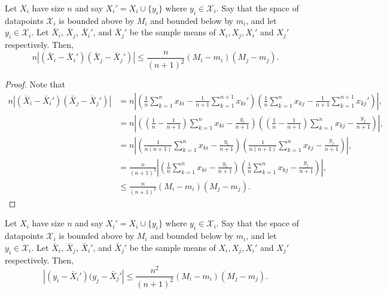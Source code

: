 \documentclass[11pt]{scrartcl} %
\begin{document}
\begin{lemma}
Let  $X_i$ have size $n$ and say $X_i' = X_i \cup \{y_i\}$ where $y_i \in \mathcal{X}_i.$ Say that the space of datapoints $\mathcal{X}_i$ is bounded above by $M_i$ and bounded below by $m_i$, and let $y_i \in \mathcal{X}_i.$ Let  $\bar{X}_i$, $\bar{X}_j$, $\bar{X}_i'$, and $\bar{X}_j'$ be the sample means of $X_i, X_j, X_i'$ and $X_j'$ respectively. Then,
$$ n \left\vert (\bar{X}_i - \bar{X}_i')(\bar{X}_j - \bar{X}_j') \right\vert \le \frac{n}{(n+1)^2}(M_i - m_i)(M_j - m_j).$$
\end{lemma}

\begin{proof}
Note that
\begin{align*}
 n \left\vert (\bar{X}_i - \bar{X}_i')(\bar{X}_j - \bar{X}_j') \right\vert &= n\left\vert \left( \frac{1}{n} \sum_{k=1}^n x_{ki} - \frac{1}{n+1} \sum_{k=1}^{n+1} x_{ki}' \right) \left( \frac{1}{n} \sum_{k=1}^n x_{kj} - \frac{1}{n+1} \sum_{k=1}^{n+1} x_{kj}' \right)\right\vert, \\
 	&= n \left\vert \left( \left(\frac{1}{n} - \frac{1}{n+1}\right) \sum_{k=1}^n x_{ki} - \frac{y_i}{n+1} \right)\left( \left(\frac{1}{n} - \frac{1}{n+1}\right) \sum_{k=1}^n x_{kj} - \frac{y_j}{n+1} \right) \right\vert, \\
	&= n  \left\vert \left(\frac{1}{n(n+1)} \sum_{k=1}^n x_{ki} - \frac{y_i}{n+1} \right)\left( \frac{1}{n(n+1)} \sum_{k=1}^n x_{kj} - \frac{y_j}{n+1} \right) \right\vert, \\
	&= \frac{n}{(n+1)^2} \left\vert \left( \frac{1}{n} \sum_{k=1}^n x_{ki} - \frac{y_i}{n+1} \right)\left( \frac{1}{n} \sum_{k=1}^n x_{kj} - \frac{y_j}{n+1} \right) \right\vert,\\
	&\le \frac{n}{(n+1)^2} (M_i - m_i)(M_j - m_j).
 \end{align*}
\end{proof}

\begin{lemma}
Let  $X_i$ have size $n$ and say $X_i' = X_i \cup \{y_i\}$ where $y_i \in \mathcal{X}_i.$ Say that the space of datapoints $\mathcal{X}_i$ is bounded above by $M_i$ and bounded below by $m_i$, and let $y_i \in \mathcal{X}_i.$ Let  $\bar{X}_i$, $\bar{X}_j$, $\bar{X}_i'$, and $\bar{X}_j'$ be the sample means of $X_i, X_j, X_i'$ and $X_j'$ respectively. Then,
$$ \left\vert (y_i - \bar{X}_i')(y_j - \bar{X}_j' \right\vert \le \frac{n^2}{(n+1)^2}(M_i - m_i)(M_j-m_j).$$
\end{lemma}
\end{document}
